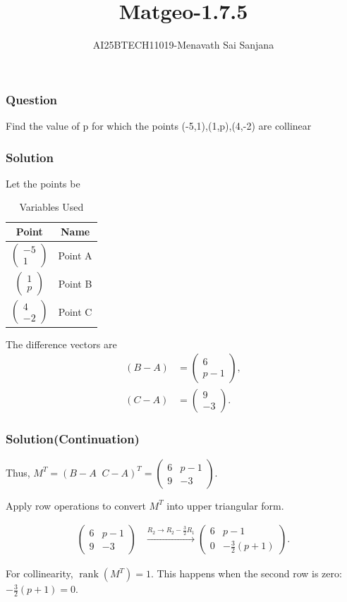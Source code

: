 \documentclass{beamer}
\title{Matgeo-1.7.5}
\author{AI25BTECH11019-Menavath Sai Sanjana}
\date{}
\theoremstyle{remark}
\newcommand{\myvec}[1]{\ensuremath{\begin{pmatrix}#1\end{pmatrix}}}
\begin{document}
\begin{frame}
\titlepage
\end{frame}

\begin{frame}
\frametitle{Question}
Find the value of p for which the points (-5,1),(1,p),(4,-2) are collinear
\end{frame}

\begin{frame}
\frametitle{Solution}

Let the points be

\begin{table}[h!]
\centering
\begin{tabular}{|c|c|}
\hline
\textbf{Point} & \textbf{Name} \\
\hline
$\myvec{-5 \\ 1}$ & Point A \\
\hline
$\myvec{1 \\ p}$ & Point B \\
\hline
$\myvec{4 \\ -2}$ & Point C \\
\hline
\end{tabular}
\caption{Variables Used}
\end{table}



The difference vectors are
\begin{align}
(B-A) &= \myvec{6 \\ p-1}, \\
(C-A) &= \myvec{9 \\ -3}.
\end{align}
\end{frame}
\begin{frame}
\frametitle{Solution(Continuation)}
Thus,
$
M^T = (B-A \;\; C-A)^T 
= \myvec{6 & p-1 \\ 9 & -3}.
$

Apply row operations to convert $M^T$ into upper triangular form.

\begin{align}
\myvec{6 & p-1 \\ 9 & -3} 
&\xrightarrow{R_2 \to R_2 - \tfrac{3}{2}R_1}
\myvec{6 & p-1 \\ 0 & -\tfrac{3}{2}(p+1)}.
\end{align}

For collinearity, $\operatorname{rank}(M^T)=1$.  
This happens when the second row is zero:
$
-\tfrac{3}{2}(p+1)=0.
$
\end{frame}
\end{document}
